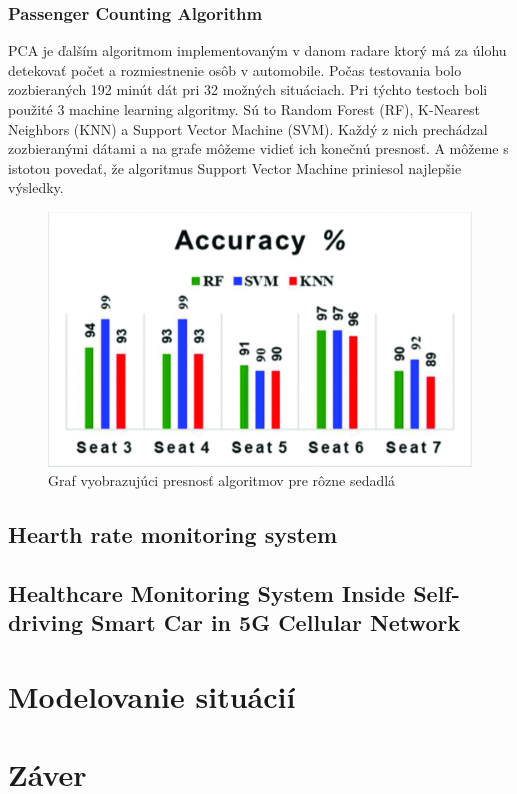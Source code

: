 \documentclass[10pt,twoside,slovak,a4paper]{article}
\begin{document}
\subsubsection{Passenger Counting Algorithm} \label{predstavenie:radar:pca}

PCA je ďalším algoritmom implementovaným v danom radare ktorý má za úlohu detekovať počet a rozmiestnenie osôb v automobile. Počas testovania bolo zozbieraných 192 minút dát pri 32 možných situáciach. Pri týchto testoch boli použité 3 machine learning algoritmy. Sú to Random Forest (RF), K-Nearest Neighbors (KNN) a Support Vector Machine (SVM). Každý z nich prechádzal zozbieranými dátami a na grafe môžeme vidieť ich konečnú presnosť. A môžeme s istotou povedať, že algoritmus Support Vector Machine priniesol najlepšie výsledky.

\begin {figure} [H]
\includegraphics[scale=0.5]{accuracy} 
\caption{Graf vyobrazujúci presnosť algoritmov pre rôzne sedadlá\cite{monitoring}}
\label{fig1}
\end {figure}

\subsection{Hearth rate monitoring system\cite{hearth}} \label{predstavenie:hearth}
\subsection{Healthcare Monitoring System Inside Self-driving Smart Car in 5G Cellular Network\cite{5g}}\label{predstavenie:5g}
\section{Modelovanie situácií} \label{modelovanie}


\section{Záver} \label{zaver} 


\end{document}
